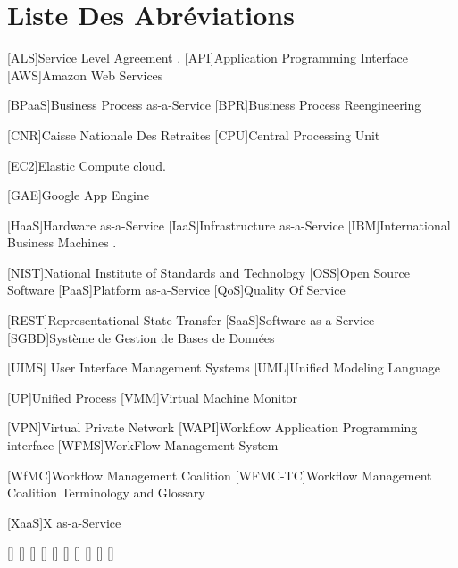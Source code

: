  
 \chapter*{Liste Des Abréviations}
 \begin{acronym}
 		{Service Level Agreement} .	 
 	 	       [API]{Application Programming Interface}	
 		{Amazon Web Services}
 		
 		    [BPaaS]{Business Process as-a-Service}	 
 		{Business Process Reengineering} 
 		
 		   {Caisse Nationale Des Retraites}
 			[CPU]{Central Processing Unit}
 		
 [EC2]{Elastic Compute cloud}.
 		
 		  	[GAE]{Google App Engine}	
 		
 		[HaaS]{Hardware as-a-Service}
 		[IaaS]{Infrastructure as-a-Service}	
 	[IBM]{International Business Machines}	 .
 	
 	
 	
 	    [NIST]{National Institute of Standards and Technology} 
 	     	       [OSS]{Open Source Software}	
 	    			[PaaS]{Platform as-a-Service}	
 	   [QoS]{Quality Of Service}	

 	   
 	    	       [REST]{Representational State Transfer}
 	   	[SaaS]{Software as-a-Service}	
 	   	  [SGBD]{Système de Gestion de Bases de Données}

    	
    	
 [UIMS]{ User Interface Management Systems}
 	       [UML]{Unified Modeling Language}

 	    	       [UP]{Unified Process}
[VMM]{Virtual Machine Monitor}  

 	  [VPN]{Virtual Private Network}
[WAPI]{Workflow Application Programming interface}
    	[WFMS]{WorkFlow Management System}
    	
    	
    	[WfMC]{Workflow Management Coalition }
    	[WFMC-TC]{Workflow Management Coalition Terminology and Glossary}		
    
	[XaaS]{X as-a-Service}	

 	  
 	  
 	  
 	  
 
 	       	  



 	       \acro{}[]{}
 	       \acro{}[]{}
 	       \acro{}[]{}
 	       \acro{}[]{}
 	       \acro{}[]{}
 	       \acro{}[]{}
 	       \acro{}[]{}
 	       \acro{}[]{}
 	       \acro{}[]{}
 	       \acro{}[]{}
 	      
 	       
 \end{acronym}
 \fancyhead{}
